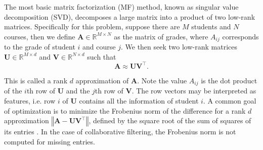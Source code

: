 \documentclass[12pt]{article}
\begin{document}
The most basic matrix factorization (MF) method,
known as singular value decomposition (SVD),
decomposes a large matrix into a product of two low-rank matrices.
Specifically for this problem, 
suppose there are $M$ students and $N$ courses,
then we define $\mathbf{A} \in \mathbb{R}^{M \times N}$ 
as the matrix of grades,
where $A_{ij}$ corresponds to the grade of 
student $i$ and course $j$.
We then seek two low-rank matrices 
$\mathbf{U} \in \mathbb{R}^{M \times d}$ 
and $\mathbf{V} \in \mathbb{R}^{N \times d}$ such that
%
\begin{equation}
	\mathbf{A} \approx \mathbf{UV}^\top .
\end{equation}

This is called a rank $d$ approximation of $\mathbf{A}$.
Note the value $A_{ij}$ is the dot product of
the $i$th row of $\mathbf{U}$ and 
the $j$th row of $\mathbf{V}$.
The row vectors may be interpreted as features,
i.e. row $i$ of $\mathbf{U}$ contains all the information
of student $i$.
A common goal of optimization is to minimize the 
Frobenius norm of the difference for a rank $d$ approximation
$\left\Vert \mathbf{A - UV}^\top \right\Vert$,
defined by the square root of the
sum of squares of its entries \cite{FeHeKh12}.
In the case of collaborative filtering,
the Frobenius norm is not computed for missing entries.


\end{document}
